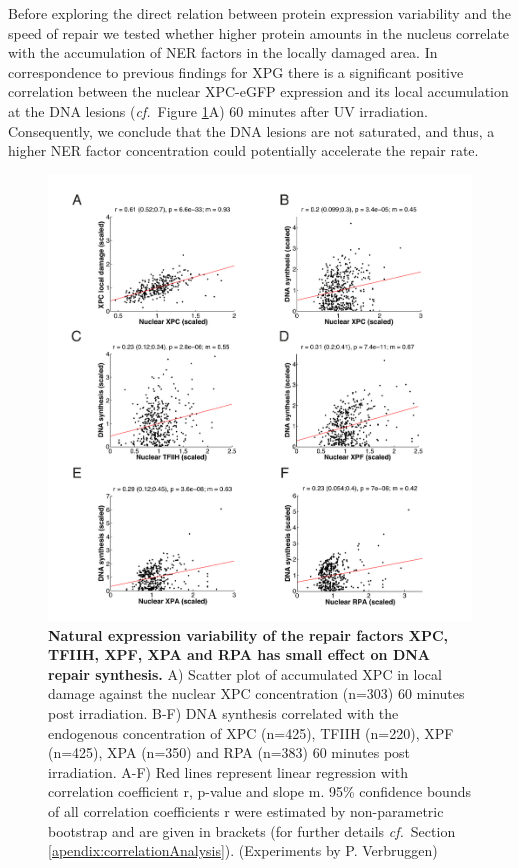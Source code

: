 Before exploring the direct relation between protein expression variability and the speed of repair we tested whether higher protein amounts in the nucleus correlate with the accumulation of NER factors in the locally damaged area. In correspondence to previous findings for XPG \cite{Luijsterburg2010} there is a significant positive correlation between the nuclear XPC-eGFP expression and its local accumulation at the DNA lesions (\textit{cf.}\ Figure \ref{fig:Nuc_vs_DNAsynthesis}A) 60 minutes after UV irradiation. Consequently, we conclude that the DNA lesions are not saturated, and thus, a higher NER factor concentration could potentially accelerate the repair rate.\\
\begin{figure}[h!]
	\begin{center}
		\includegraphics[width=1\textwidth]{Abbildungen/figure3_3.pdf}
		\caption{\textbf{Natural expression variability of the repair factors XPC, TFIIH, XPF, XPA and RPA has small effect on DNA repair synthesis.} A) Scatter plot of accumulated XPC in local damage against the nuclear XPC concentration (n=303) 60 minutes post irradiation. B-F) DNA synthesis correlated with the endogenous concentration of XPC (n=425), TFIIH (n=220), XPF (n=425), XPA (n=350) and RPA (n=383) 60 minutes post irradiation. A-F) Red lines represent linear regression with correlation coefficient r, p-value and slope m. 95\% confidence bounds of all correlation coefficients r were estimated by non-parametric bootstrap and are given in brackets (for further details \textit{cf.}\ Section \ref{apendix:correlationAnalysis}). (Experiments by P. Verbruggen)}
		\label{fig:Nuc_vs_DNAsynthesis}
	\end{center}
\end{figure}

